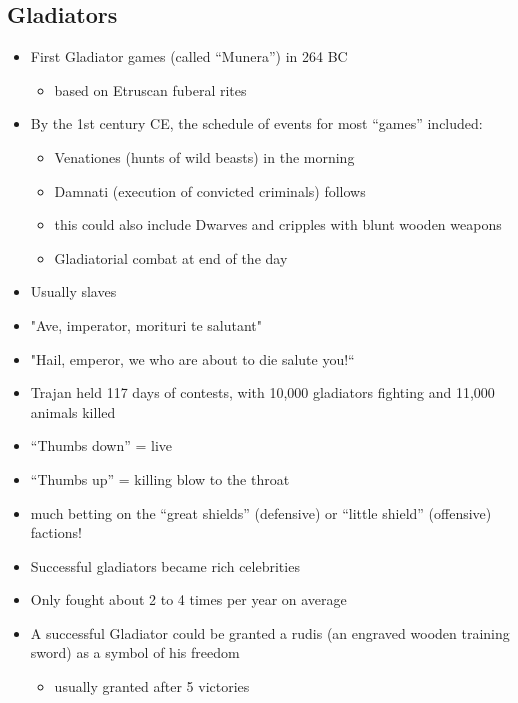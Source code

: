 \documentclass[12pt, twoside]{article}
\begin{document}
\subsection{Gladiators}
\begin{itemize}
\item First Gladiator games (called “Munera”) in 264 BC
	\begin{itemize}
	\item based on Etruscan fuberal rites
	\end{itemize}
\item By the 1st century CE, the schedule of events for most “games” included:
	\begin{itemize}
	\item Venationes (hunts of wild beasts) in the morning
	\item Damnati (execution of convicted criminals) follows
	\item this could also include Dwarves and cripples with blunt wooden weapons
	\item Gladiatorial combat at end of the day
	\end{itemize}
\item Usually slaves
\item "Ave, imperator, morituri te salutant"
\item "Hail, emperor, we who are about to die salute you!“
\item Trajan held 117 days of contests, with 10,000 gladiators fighting and 11,000 animals killed
\item “Thumbs down” = live
\item “Thumbs up” = killing blow to the throat
\item much betting on the “great shields” (defensive) or “little shield” (offensive) factions!
\item Successful gladiators became rich celebrities
\item Only fought about 2 to 4 times per year on average
\item A successful Gladiator could be granted a rudis (an engraved wooden training sword) as a symbol of his freedom
	\begin{itemize}
	\item usually granted after 5 victories
	\end{itemize}
\end{itemize}
\end{document}
